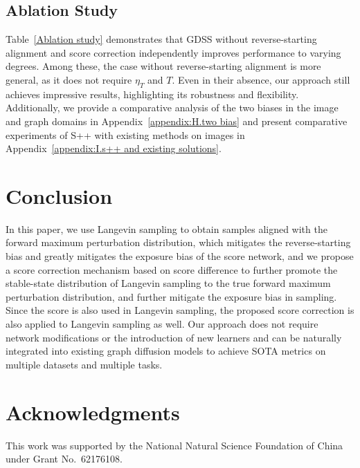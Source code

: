 \documentclass{article}
\begin{document}
\subsection{Ablation Study}\label{subsec:ablation study}
Table~\ref{Ablation study} demonstrates that GDSS without reverse-starting alignment and score correction independently improves performance to varying degrees. Among these, the case without reverse-starting alignment is more general, as it does not require $\eta_T$ and $T$. Even in their absence, our approach still achieves impressive results,  highlighting its robustness and flexibility. Additionally, we provide a comparative analysis of the two biases in the image and graph domains in Appendix~\ref{appendix:H.two bias} and present comparative experiments of S++ with existing methods on images in Appendix~\ref{appendix:I.s++ and existing solutions}.
\section{Conclusion}
In this paper, we use Langevin sampling to obtain samples aligned with the forward maximum perturbation distribution, which mitigates the reverse-starting bias and greatly mitigates the exposure bias of the score network, and we propose a score correction mechanism based on score difference to further promote the stable-state distribution of Langevin sampling to the true forward maximum perturbation distribution, and further mitigate the exposure bias in sampling. Since the score is also used in Langevin sampling, the proposed score correction is also applied to Langevin sampling as well. Our approach does not require network modifications or the introduction of new learners and can be naturally integrated into existing graph diffusion models to achieve SOTA metrics on multiple datasets and multiple tasks. 

\section*{Acknowledgments}
This work was supported by the National Natural Science Foundation of China under Grant No.~62176108.


\clearpage
\appendix
\end{document}
